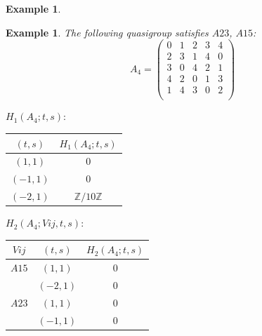 \documentclass[11pt]{amsart}
\newtheorem{example}[theorem]{Example}
\theoremstyle{definition}
\newcommand{\Z}{\mathbb{Z}}
\begin{document}
\begin{example}
\begin{center}
\end{center}

\end{example}


\begin{example}
The following quasigroup satisfies 
$A23$, $A15$:
   \[ A_4 = \left( \begin{array}{ccccc}
 0 & 1 & 2 & 3 & 4 \\
 2 & 3 & 1 & 4 & 0 \\
 3 & 0 & 4 & 2 & 1 \\
 4 & 2 & 0 & 1 & 3 \\
 1 & 4 & 3 & 0 & 2 \\
\end{array} \right) \]



\bigskip


$H_1(A_4;t,s):$

\begin{center}
    
\begin{tabular}{c|c}
    $(t,s)$ & $H_1(A_4;t,s)$  \\
    \hline
    $(1,1)$ & $0$ \\
    $(-1,1)$ & $0$ \\
    $(-2,1)$ & $\Z/10\Z$ \\
\end{tabular}
\end{center}
\bigskip

$H_2(A_4;Vij,t,s):$

\begin{center}
    
\begin{tabular}{c|c|c}
    $Vij$ & $(t,s)$ & $H_2(A_4;t,s)$  \\
    \hline
    $A15$ & $(1,1)$ & $0$ \\
        & $(-2,1)$ & $0$ \\
    $A23$ & $(1,1)$ & $0$ \\
        & $(-1,1)$ & $0$ \\
\end{tabular}
\end{center}

\end{example}
\end{document}
